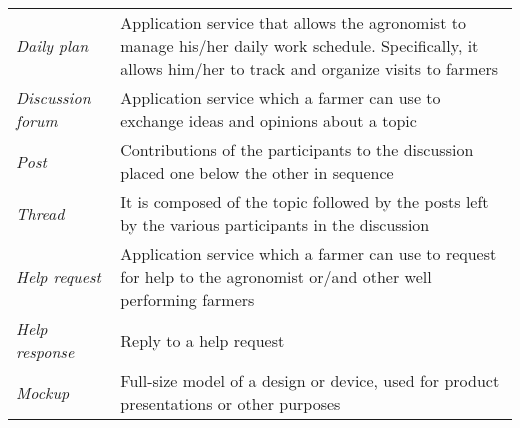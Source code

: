 \begin{center}
\begin{longtable}{|m{3.2cm}|m{8.3cm}|}
\textit{Daily plan} & Application service that allows the agronomist to manage his/her daily work schedule. Specifically, it allows him/her to track and organize visits to farmers\\
\textit{Discussion forum} & Application service which a farmer can use to exchange ideas and opinions about a topic\\
\textit{Post} & Contributions of the participants to the discussion placed one below the other in sequence\\
\textit{Thread} & It is composed of the topic followed by the posts left by the various participants in the discussion\\
\textit{Help request} & Application service which a farmer can use to request for help to the agronomist or/and other well performing farmers\\
\textit{Help response} & Reply to a help request\\
\textit{Mockup} & Full-size model of a design or device, used for product presentations or other purposes\\
\end{longtable}
\end{center}